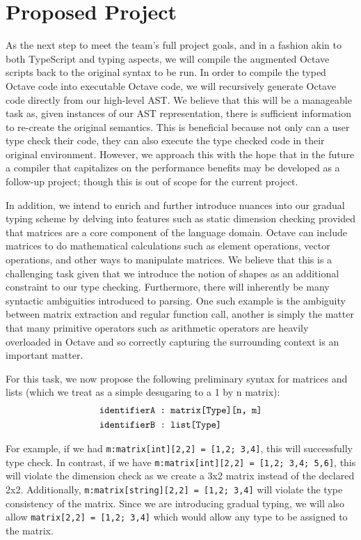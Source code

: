 \section{Proposed Project}
As the next step to meet the team's full project goals, and in a fashion akin to both TypeScript and typing aspects, we will compile the augmented Octave scripts back to the original syntax to be run. In order to compile the typed Octave code into executable Octave code, we will recursively generate Octave code directly from our high-level AST. We believe that this will be a manageable task as, given instances of our AST representation, there is sufficient information to re-create the original semantics. This is beneficial because not only can a user type check their code, they can also execute the type checked code in their original environment. However, we approach this with the hope that in the future a compiler that capitalizes on the performance benefits may be developed as a follow-up project; though this is out of scope for the current project.

In addition, we intend to enrich and further introduce nuances into our gradual typing scheme by delving into features such as static dimension checking provided that matrices are a core component of the language domain. Octave can include matrices to do mathematical calculations such as element operations, vector operations, and other ways to manipulate matrices. We believe that this is a challenging task given that we introduce the notion of shapes as an additional constraint to our type checking. Furthermore, there will inherently be many syntactic ambiguities introduced to parsing. One such example is the ambiguity between matrix extraction and regular function call, another is simply the matter that many primitive operators such as arithmetic operators are heavily overloaded in Octave and so correctly capturing the surrounding context is an important matter.

For this task, we now propose the following preliminary syntax for matrices and lists (which we treat as a simple desugaring to a 1 by n matrix):
\begin{align*}
& \text{\tt identifierA : matrix[Type][n, m]} \\
& \text{\tt identifierB : list[Type]}
\end{align*}

For example, if we had {\tt m:matrix[int][2,2] = [1,2; 3,4]}, this will successfully type check. In contrast, if we have  {\tt m:matrix[int][2,2] = [1,2; 3,4; 5,6]}, this will violate the dimension check as we create a 3x2 matrix instead of the declared 2x2. Additionally, {\tt m:matrix[string][2,2] = [1,2; 3,4]} will violate the type consistency of the matrix. Since we are introducing gradual typing, we will also allow {\tt matrix[2,2] = [1,2; 3,4]} which would allow any type to be assigned to the matrix.

